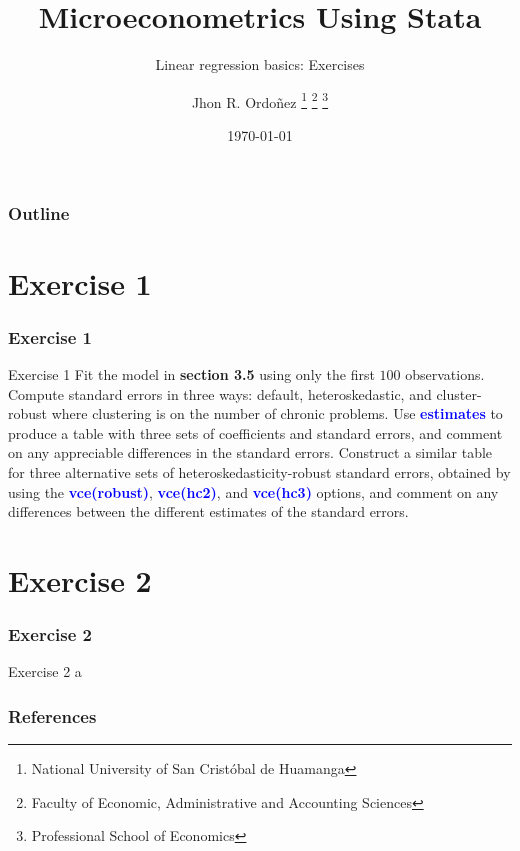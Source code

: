 \documentclass[11pt, aspectratio=169]{beamer}
\title{Microeconometrics Using Stata}
\subtitle{Linear regression basics: Exercises}
\author{
		Jhon R. Ordoñez
		\footnote{\label{1} National University of San Cristóbal de Huamanga}
		\footnote{\label{2} Faculty of Economic, Administrative and Accounting Sciences}
		\footnote{\label{3} Professional School of Economics}
	}
\date{\today}
\begin{document}
	\begin{frame}
		\maketitle
	\end{frame}
	\begin{frame}[t]
		\frametitle{Outline}
		\tableofcontents
	\end{frame}
	\section{Exercise 1}
		\begin{frame}
			\frametitle{Exercise 1}
				\begin{block}{Exercise 1}
					Fit the model in \textcolor{red!50}{\textbf{section 3.5}} using only the first $100$ observations.
					Compute standard errors in three ways: default, heteroskedastic, and
					cluster-robust where clustering is on the number of chronic problems.
					Use \textcolor{blue}{\textbf{estimates}} to produce a table with three sets of coefficients and
					standard errors, and comment on any appreciable differences in the
					standard errors. Construct a similar table for three alternative sets of
					heteroskedasticity-robust standard errors, obtained by using the
					\textcolor{blue}{\textbf{vce(robust)}}, \textcolor{blue}{\textbf{vce(hc2)}}, and \textcolor{blue}{\textbf{vce(hc3)}} options, and comment on any
					differences between the different estimates of the standard errors.
				\end{block}
		\end{frame}
	\section{Exercise 2}
		\begin{frame}
			\frametitle{Exercise 2}
			\begin{block}{Exercise 2}
				a
			\end{block}
		\end{frame}
	\begin{frame}[t,allowframebreaks]
		\frametitle{References}
		
		
		\nocite{cameron2022-I}
		\nocite{cameron2022-II}
	\end{frame}
	\begin{frame}
		\maketitle
	\end{frame}
\end{document}
